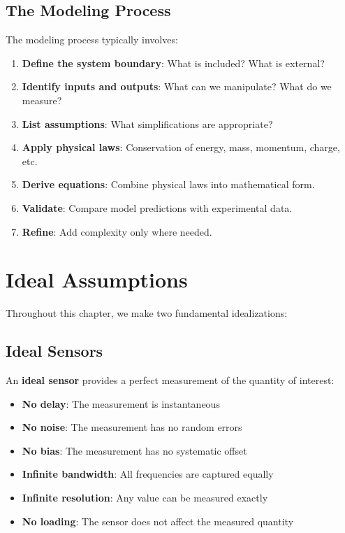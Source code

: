\section{The Modeling Process}



The modeling process typically involves:

\begin{enumerate}
    \item \textbf{Define the system boundary}: What is included? What is external?

    \item \textbf{Identify inputs and outputs}: What can we manipulate? What do we measure?

    \item \textbf{List assumptions}: What simplifications are appropriate?

    \item \textbf{Apply physical laws}: Conservation of energy, mass, momentum, charge, etc.

    \item \textbf{Derive equations}: Combine physical laws into mathematical form.

    \item \textbf{Validate}: Compare model predictions with experimental data.

    \item \textbf{Refine}: Add complexity only where needed.
\end{enumerate}

\chapter{Ideal Assumptions}
\label{ch:ideal_assumptions}

Throughout this chapter, we make two fundamental idealizations:

\section{Ideal Sensors}

An \textbf{ideal sensor} provides a perfect measurement of the quantity of interest:

\begin{itemize}
    \item \textbf{No delay}: The measurement is instantaneous
    \item \textbf{No noise}: The measurement has no random errors
    \item \textbf{No bias}: The measurement has no systematic offset
    \item \textbf{Infinite bandwidth}: All frequencies are captured equally
    \item \textbf{Infinite resolution}: Any value can be measured exactly
    \item \textbf{No loading}: The sensor does not affect the measured quantity
\end{itemize}

